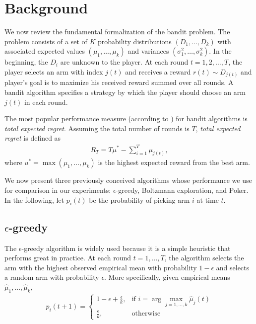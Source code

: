 \documentclass[12pt]{article}
\begin{document}
\section{Background}
We now review the fundamental formalization of the bandit problem. The problem consists of a set of $K$ probability distributions
$(D_1, \ldots, D_k)$ with associated expected values $(\mu_1, \ldots, \mu_k)$ and variances $(\sigma^2_1, \ldots, \sigma^2_k)$.
In the beginning, the $D_i$ are unknown to the player.  At each round $t = 1,2,\ldots,T$, the player selects an arm with index $j(t)$
and receives a reward $r(t) \sim D_{j(t)}$ and player's goal is to maximize his received reward summed over all rounds.  A bandit algorithm
specifies a strategy by which the player should choose an arm $j(t)$ in each round.

The most popular performance measure (according to \cite{Kuleshov}) for bandit algorithms is \emph{total expected regret}.  Assuming the 
total number of rounds is $T$, \emph{total expected regret} is defined as
\begin{align}
R_T = T\mu^{*} - \sum_{i=1}^{T} \mu_{j(t)},
\end{align}
where $u^{*} = \max(\mu_1, \ldots, \mu_k)$ is the highest expected reward from the best arm. 

We now present three previously conceived algorithms whose performance we use for comparison in our experiments:  $\epsilon$-greedy, Boltzmann exploration, and Poker.
In the following, let $p_i(t)$ be the probability of picking arm $i$ at time $t$.

\subsection{$\epsilon$-greedy}
The $\epsilon$-greedy algorithm is widely used because it is a simple heuristic that performs great in practice. 
At each round $t = 1, \ldots, T$, the algorithm selects the arm with the highest observed empirical mean with probability $1 - \epsilon$ and
selects a random arm with probability $\epsilon$.  More specifically, given empirical means $\hat{\mu}_1, \ldots, \hat{\mu}_k$,
\begin{align*}
p_i(t+1) = 
\begin{cases}
1 - \epsilon + \frac{\epsilon}{k}, & \textrm{if } i = \arg \max_{j = 1, \ldots, k} \hat{\mu}_j(t) \\
\frac{\epsilon}{k}, & \textrm{otherwise}
\end{cases}
\end{align*}
\end{document}
